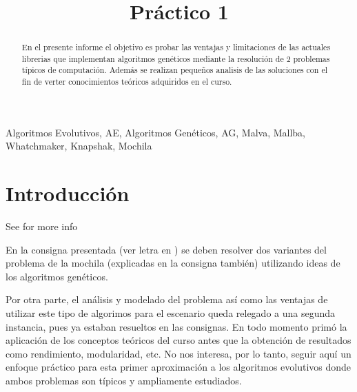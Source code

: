 \documentclass[9pt,conference]{IEEEtran}
\begin{document}
	\title{Pr\'actico 1}
	\author{
		\and
	}



	\maketitle

	\begin{abstract}
	En el presente informe el objetivo es probar las ventajas y limitaciones de las actuales librerias que implementan algoritmos gen\'eticos mediante la resoluci\'on de 2 problemas t\'ipicos de computaci\'on. Adem\'as se realizan pequeños analisis de las soluciones con el fin de verter conocimientos te\'oricos adquiridos en el curso.
	\end{abstract}
	\begin{IEEEkeywords}
	Algoritmos Evolutivos, AE, Algoritmos Gen\'eticos, AG, Malva, Mallba, Whatchmaker, Knapshak, Mochila
	\end{IEEEkeywords}

	\section{Introducci\'on}
	See \cite{refmallba} for more info

	En la consigna presentada (ver letra en \cite{refmallba}) se deben resolver dos variantes del problema de la mochila (explicadas en la consigna tambi\'en) utilizando ideas de los algoritmos gen\'eticos.

	Por otra parte, el an\'alisis y modelado del problema as\'i como las ventajas de utilizar este tipo de algorimos para el escenario queda relegado a una segunda instancia, pues ya estaban resueltos en las consignas. En todo momento prim\'o la aplicaci\'on de los conceptos te\'oricos del curso antes que la obtenci\'on de resultados como rendimiento, modularidad, etc. No nos interesa, por lo tanto, seguir aqu\'i un enfoque pr\'actico para esta primer aproximaci\'on a los algoritmos evolutivos donde ambos problemas son t\'ipicos y ampliamente estudiados.
\end{document}
